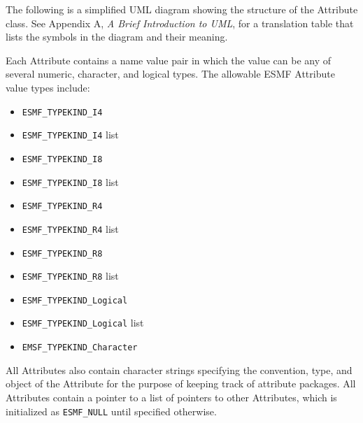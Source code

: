 %


The following is a simplified UML diagram showing the structure of the
Attribute class.  See Appendix A, {\it A Brief Introduction to UML},
for a translation table that lists the symbols in the diagram and their 
meaning.


Each Attribute contains a name value pair in which the value can be any of several numeric, character, and logical types.  The allowable ESMF Attribute value types include:

\begin{itemize}
\item {\tt ESMF\_TYPEKIND\_I4}
\item {\tt ESMF\_TYPEKIND\_I4} list
\item {\tt ESMF\_TYPEKIND\_I8}
\item {\tt ESMF\_TYPEKIND\_I8} list
\item {\tt ESMF\_TYPEKIND\_R4}
\item {\tt ESMF\_TYPEKIND\_R4} list
\item {\tt ESMF\_TYPEKIND\_R8}
\item {\tt ESMF\_TYPEKIND\_R8} list
\item {\tt ESMF\_TYPEKIND\_Logical}
\item {\tt ESMF\_TYPEKIND\_Logical} list
\item {\tt EMSF\_TYPEKIND\_Character}
\end{itemize}

All Attributes also contain character strings specifying the convention, type, and object of the Attribute for the purpose of keeping track of attribute packages.  All Attributes contain a pointer to a list of pointers to other Attributes, which is initialized as {\tt ESMF\_NULL} until specified otherwise.
